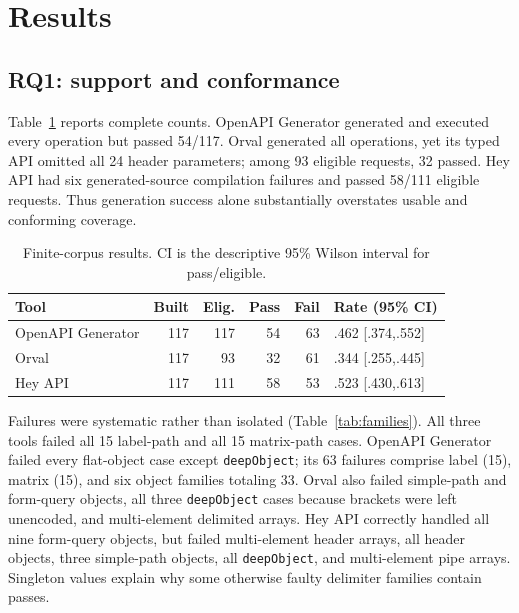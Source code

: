\documentclass[runningheads]{llncs}
\begin{document}
\section{Results}

\subsection{RQ1: support and conformance}

Table~\ref{tab:main} reports complete counts. OpenAPI Generator generated and executed every operation but passed 54/117. Orval generated all operations, yet its typed API omitted all 24 header parameters; among 93 eligible requests, 32 passed. Hey API had six generated-source compilation failures and passed 58/111 eligible requests. Thus generation success alone substantially overstates usable and conforming coverage.

\begin{table}[t]
\caption{Finite-corpus results. CI is the descriptive 95\% Wilson interval for pass/eligible.}
\label{tab:main}
\centering\small
\begin{tabular}{@{}lrrrrl@{}}
\toprule
Tool & Built & Elig. & Pass & Fail & Rate (95\% CI)\\ \midrule
OpenAPI Generator &117&117&54&63&.462 [.374,.552]\\
Orval &117&93&32&61&.344 [.255,.445]\\
Hey API &117&111&58&53&.523 [.430,.613]\\
\bottomrule
\end{tabular}
\end{table}

Failures were systematic rather than isolated (Table~\ref{tab:families}). All three tools failed all 15 label-path and all 15 matrix-path cases. OpenAPI Generator failed every flat-object case except \texttt{deepObject}; its 63 failures comprise label (15), matrix (15), and six object families totaling 33. Orval also failed simple-path and form-query objects, all three \texttt{deepObject} cases because brackets were left unencoded, and multi-element delimited arrays. Hey API correctly handled all nine form-query objects, but failed multi-element header arrays, all header objects, three simple-path objects, all \texttt{deepObject}, and multi-element pipe arrays. Singleton values explain why some otherwise faulty delimiter families contain passes.
\end{document}

